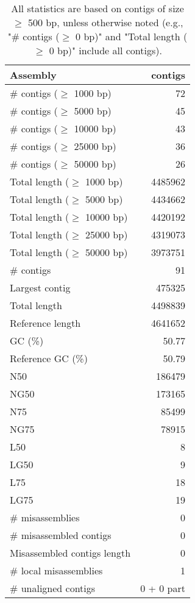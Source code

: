 \documentclass[12pt,a4paper]{article}
\begin{document}
\begin{table}[ht]
\begin{center}
\caption{All statistics are based on contigs of size $\geq$ 500 bp, unless otherwise noted (e.g., "\# contigs ($\geq$ 0 bp)" and "Total length ($\geq$ 0 bp)" include all contigs).}
\begin{tabular}{|l*{1}{|r}|}
\hline
Assembly & contigs \\ \hline
\# contigs ($\geq$ 1000 bp) & 72 \\ \hline
\# contigs ($\geq$ 5000 bp) & 45 \\ \hline
\# contigs ($\geq$ 10000 bp) & 43 \\ \hline
\# contigs ($\geq$ 25000 bp) & 36 \\ \hline
\# contigs ($\geq$ 50000 bp) & 26 \\ \hline
Total length ($\geq$ 1000 bp) & 4485962 \\ \hline
Total length ($\geq$ 5000 bp) & 4434662 \\ \hline
Total length ($\geq$ 10000 bp) & 4420192 \\ \hline
Total length ($\geq$ 25000 bp) & 4319073 \\ \hline
Total length ($\geq$ 50000 bp) & 3973751 \\ \hline
\# contigs & 91 \\ \hline
Largest contig & 475325 \\ \hline
Total length & 4498839 \\ \hline
Reference length & 4641652 \\ \hline
GC (\%) & 50.77 \\ \hline
Reference GC (\%) & 50.79 \\ \hline
N50 & 186479 \\ \hline
NG50 & 173165 \\ \hline
N75 & 85499 \\ \hline
NG75 & 78915 \\ \hline
L50 & 8 \\ \hline
LG50 & 9 \\ \hline
L75 & 18 \\ \hline
LG75 & 19 \\ \hline
\# misassemblies & 0 \\ \hline
\# misassembled contigs & 0 \\ \hline
Misassembled contigs length & 0 \\ \hline
\# local misassemblies & 1 \\ \hline
\# unaligned contigs & 0 + 0 part \\ \hline

\end{tabular}
\end{center}
\end{table}
\end{document}
